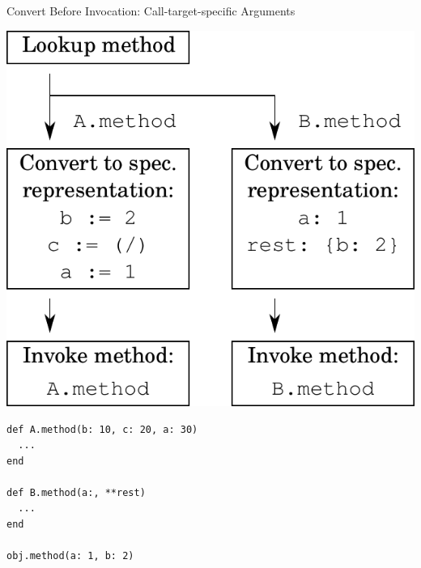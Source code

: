 \documentclass[xcolor=dvipsname]{beamer} %
\begin{document}
\begin{frame}[fragile]{Convert Before Invocation: Call-target-specific Arguments}
\begin{minipage}{0.55\textwidth}
\centering
\includegraphics[height=0.6\textheight]{convert_before2.pdf}
\end{minipage} %
\begin{minipage}{0.4\textwidth}
\begin{lstlisting}
def A.method(b: 10, c: 20, a: 30)
  ...
end

def B.method(a:, **rest)
  ...
end

obj.method(a: 1, b: 2)
\end{lstlisting}
\end{minipage}
\end{frame}
\end{document}
